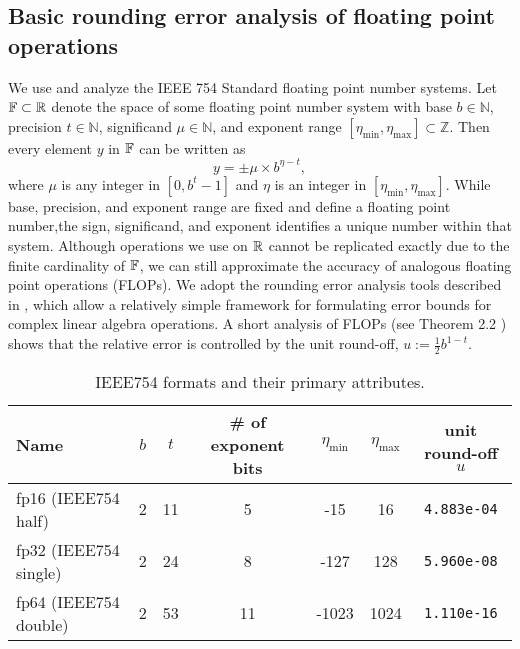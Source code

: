 \subsection{Basic rounding error analysis of floating point operations}\label{sec:backgroundRE}
We use and analyze the IEEE 754 Standard floating point number systems.
Let $\mathbb{F} \subset \mathbb{R}$ denote the space of some floating point number system with base $b\in\mathbb{N}$, precision $t\in\mathbb{N}$, significand $\mu\in\mathbb{N}$, and exponent range $[\eta_{\text{min}}, \eta_{\text{max}}]\subset \mathbb{Z}$.
Then every element $y$ in $\mathbb{F}$ can be written as 
\begin{equation}
y = \pm \mu\times b^{\eta-t},
\label{eqn:FPbasic}
\end{equation} 
where $\mu$ is any integer in $[0,b^{t}-1]$ and $\eta$ is an integer in  $[\eta_{\text{min}}, \eta_{\text{max}}]$.
While base, precision, and exponent range are fixed and define a floating point number,the sign, significand, and exponent identifies a unique number within that system.
Although operations we use on $\mathbb{R}$ cannot be replicated exactly due to the finite cardinality of $\mathbb{F}$, we can still approximate the accuracy of analogous floating point operations (FLOPs).
We adopt the rounding error analysis tools described in \cite{Higham2002}, which allow a relatively simple framework for formulating error bounds for complex linear algebra operations. 
A short analysis of FLOPs (see Theorem 2.2 \cite{Higham2002}) shows that the relative error is 
controlled by the unit round-off, $u:=\frac{1}{2}b^{1-t}$. \par 
\vspace{.2cm}
\begin{table}[H]
	\begin{tabular}{||l|c|c|c|c|c|c||} 
		\hline 
		Name & $b$ & $t$ & \# of exponent bits & $\eta_{\text{min}}$ & $\eta_{\text{max}}$ & unit round-off $u$ \\ \hline 
		fp16 (IEEE754 half)& 2 & 11 & 5 & -15 & 16  & {\tt 4.883e-04} \\ \hline 
		fp32 (IEEE754 single)& 2 & 24 & 8 & -127 & 128  & {\tt 5.960e-08} \\ \hline 
		fp64 (IEEE754 double)& 2 & 53 & 11 & -1023 & 1024 & {\tt 1.110e-16} \\ \hline 
	\end{tabular}
	\caption{IEEE754 formats and their primary attributes.} %
	\label{table:ieee}
\end{table}
\vspace{.2cm}

